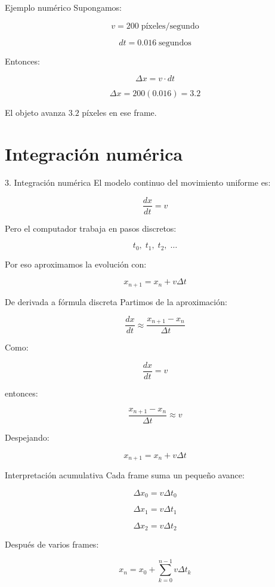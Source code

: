 \documentclass{beamer}
\begin{document}
\begin{frame}{Ejemplo numérico}
Supongamos:

\[
v=200\; \text{píxeles/segundo}
\]

\[
dt=0.016\; \text{segundos}
\]

Entonces:

\[
\Delta x=v\cdot dt
\]

\[
\Delta x=200(0.016)=3.2
\]

\medskip

El objeto avanza \(3.2\) píxeles en ese frame.
\end{frame}

\section{Integración numérica}

\begin{frame}{3. Integración numérica}
El modelo continuo del movimiento uniforme es:

\[
\frac{dx}{dt}=v
\]

\medskip

Pero el computador trabaja en pasos discretos:

\[
t_0,\; t_1,\; t_2,\; \ldots
\]

\medskip

Por eso aproximamos la evolución con:

\[
x_{n+1}=x_n+v\Delta t
\]
\end{frame}

\begin{frame}{De derivada a fórmula discreta}
Partimos de la aproximación:

\[
\frac{dx}{dt}
\approx
\frac{x_{n+1}-x_n}{\Delta t}
\]

Como:

\[
\frac{dx}{dt}=v
\]

entonces:

\[
\frac{x_{n+1}-x_n}{\Delta t}
\approx v
\]

Despejando:

\[
x_{n+1}=x_n+v\Delta t
\]
\end{frame}

\begin{frame}{Interpretación acumulativa}
Cada frame suma un pequeño avance:

\[
\Delta x_0=v\Delta t_0
\]

\[
\Delta x_1=v\Delta t_1
\]

\[
\Delta x_2=v\Delta t_2
\]

\medskip

Después de varios frames:

\[
x_n=x_0+\sum_{k=0}^{n-1}v\Delta t_k
\]
\end{frame}
\end{document}
